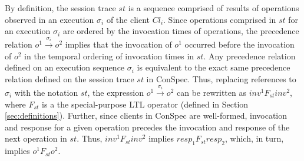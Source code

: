 \documentclass[journal,compsoc]{IEEEtran}
\begin{document}
  By definition,  the session trace $\mathit{st}$ is a sequence comprised of results of operations observed in an execution $\sigma_i$ of the client $\mathit{Cl}_i$. Since operations comprised in $\mathit{st}$ for an execution $\sigma_i$ are ordered by the invocation times of  operations,  the precedence  relation $ \mathit{o}^1 \xrightarrow{\sigma_i} \mathit{o}^2 $ %
  implies that the invocation of $\mathit{o}^1$ occurred before the invocation of $\mathit{o}^2$ in the temporal ordering of invocation times in  $\mathit{st}$. %
   Any precedence relation defined on an execution sequence $\sigma_i$  is
   equivalent to the exact same precedence relation defined on the session trace $\mathit{st}$ in ConSpec.
    Thus, replacing references to $\sigma_i$  with the notation  $\mathit{st}$, the expression $ \mathit{o}^1 \xrightarrow{\sigma_i} \mathit{o}^2 $ can be rewritten as  $\mathit{inv}^1 F_\mathit{st} \mathit{inv}^2$, where $F_\mathit{st}$  is a  the special-purpose LTL operator (defined in Section \ref{sec:definitions}).  Further, since clients in ConSpec are well-formed, invocation and response for a given operation precedes the invocation and response of the next operation in $\mathit{st}$.  %
  Thus,  $\mathit{inv}^1 F_\mathit{st} \mathit{inv}^2$ implies $ \mathit{resp}_1 F_\mathit{st}  \mathit{resp}_2 $, which, in turn, implies $\mathit{o}^1 F_\mathit{st} \mathit{o}^2$. 
\end{document}
